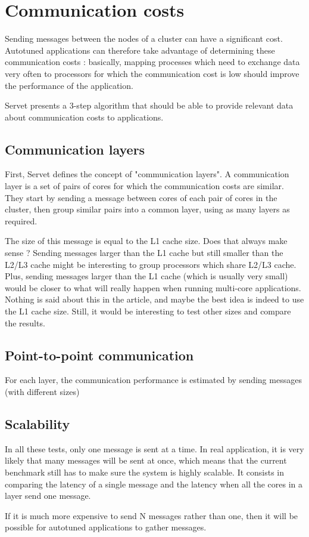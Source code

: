 \section{Communication costs}
Sending messages between the nodes of a cluster can have a significant cost.
Autotuned applications can therefore take advantage of determining these
communication costs : basically, mapping processes which need to exchange data
very often to processors for which the communication cost is low should improve
the performance of the application\cite{MPIPP}.

Servet presents a 3-step algorithm that should be able to provide relevant data
about communication costs to applications.

\subsection{Communication layers}
First, Servet defines the concept of "communication layers". A communication
layer is a set of pairs of cores for which the communication costs are similar.
They start by sending a message between cores of each pair of cores in the
cluster, then group similar pairs into a common layer, using as many layers as
required.

The size of this message is equal to the L1 cache size. Does that always make
sense ? Sending messages larger than the L1 cache but still smaller than the
L2/L3 cache might be interesting to group processors which share L2/L3 cache.
Plus, sending messages larger than the L1 cache (which is usually very small)
would be closer to what will really happen when running multi-core applications.
Nothing is said about this in the article, and maybe the best idea is indeed to
use the L1 cache size. Still, it would be interesting to test other sizes and
compare the results.

\subsection{Point-to-point communication}
For each layer, the communication performance is estimated by sending messages
(with different sizes) 

\subsection{Scalability}
In all these tests, only one message is sent at a time. In real application, it
is very likely that many messages will be sent at once, which means that the
current benchmark still has to make sure the system is highly scalable. It
consists in comparing the latency of a single message and the latency when all
the cores in a layer send one message.

If it is much more expensive to send N messages rather than one, then it will be
possible for autotuned applications to gather messages.
